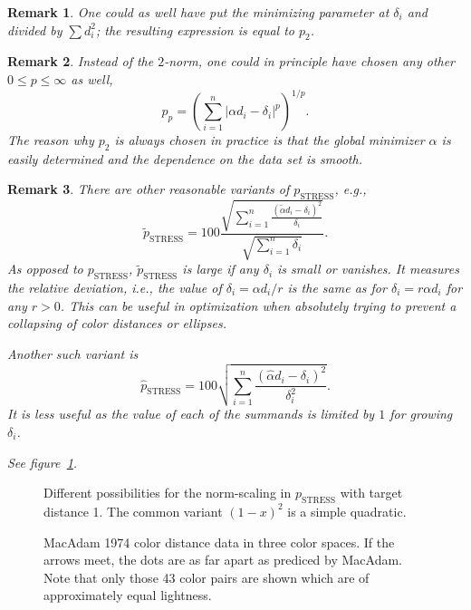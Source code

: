\documentclass{scrartcl}
\newtheorem*{remark}{Remark}
\theoremstyle{named}
\begin{document}
\begin{remark}
One could as well have put the minimizing parameter at $\delta_i$ and divided by $\sum
  d_i^2$; the resulting expression is equal to $p_2$.
\end{remark}

\begin{remark}
Instead of the $2$-norm, one could in principle have chosen any other $0\le p\le\infty$
  as well,
\[
p_p = \left(\sum_{i=1}^n |\alpha d_i - \delta_i|^p\right)^{1/p}.
\]
The reason why $p_2$ is always chosen in practice is that the global minimizer $\alpha$
  is easily determined and the dependence on the data set is smooth.
\end{remark}

\begin{remark}
  There are other reasonable variants of $p_\text{STRESS}$, e.g.,
  \[
    \tilde{p}_\text{STRESS} = 100 \frac{\sqrt{\sum_{i=1}^n \frac{(\tilde{\alpha} d_i -
    \delta_i)^2}{\delta_i}}}{\sqrt{\sum_{i=1}^n \delta_i}}.
  \]
  As opposed to $p_\text{STRESS}$, $\tilde{p}_\text{STRESS}$ is  large if any $\delta_i$
  is small or vanishes.
  It measures the \emph{relative} deviation, i.e., the value of $\delta_i=\alpha d_i / r
  $ is the same as for $\delta_i = r \alpha d_i$ for any $r > 0$.  This can be useful in
  optimization when absolutely trying to prevent a collapsing of color distances or
  ellipses.

  Another such variant is
  \[
    \hat{p}_\text{STRESS} = 100 \sqrt{\sum_{i=1}^n \frac{(\hat{\alpha} d_i -
    \delta_i)^2}{\delta_i^2}}.
  \]
  It is less useful as the value of each of the summands is limited by $1$ for growing
  $\delta_i$.

  See figure~\ref{fig:norm-scaling}.
\end{remark}

\begin{figure}
  \label{fig:norm-scaling}
  \centering
  
  \caption{Different possibilities for the norm-scaling in $p_\text{STRESS}$ with target
  distance 1. The common variant $(1-x)^2$ is a simple quadratic.}
\end{figure}

\begin{figure}
  \centering
  
  \hfill
  
  \hfill
  
  \caption{MacAdam 1974 color distance data in three color spaces. If the arrows meet,
  the dots are as far apart as prediced by MacAdam. Note that only those 43 color pairs
  are shown which are of approximately equal lightness.}
\end{figure}
\end{document}
